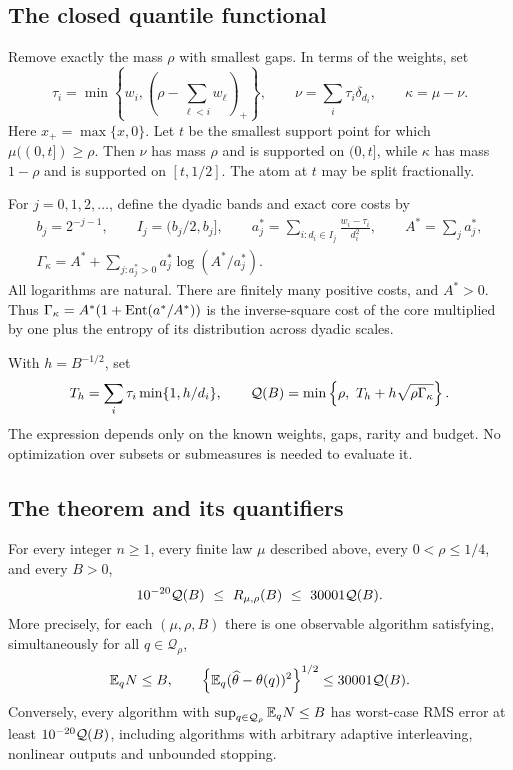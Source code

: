 \subsection{The closed quantile functional}
Remove exactly the mass $\rho$ with smallest gaps. In terms of the
weights, set
\begin{equation}\label{eq:quantile-split}
 \tau_i=\min\left\{w_i,\left(\rho-\sum_{\ell<i}w_\ell\right)_+\right\},
 \qquad \nu=\sum_i\tau_i\delta_{d_i},\qquad \kappa=\mu-\nu.
\end{equation}
Here $x_+=\max\{x,0\}$. Let $t$ be the smallest support point for
which $\mu((0,t])\ge\rho$. Then $\nu$ has mass $\rho$ and is supported
on $(0,t]$, while $\kappa$ has mass $1-\rho$ and is supported on
$[t,1/2]$. The atom at $t$ may be split fractionally.

For $j=0,1,2,\ldots$, define the dyadic bands and exact core costs by
\begin{equation}\label{eq:core-entropy}
 \begin{gathered}
 b_j=2^{-j-1},\qquad I_j=(b_j/2,b_j],\qquad
 a_j^*=\sum_{i:d_i\in I_j}\frac{w_i-\tau_i}{d_i^2},
 \qquad A^*=\sum_j a_j^*,\\
 \Gamma_\kappa=A^*+\sum_{j:a_j^*>0}a_j^*\log(A^*/a_j^*).
 \end{gathered}
\end{equation}
All logarithms are natural. There are finitely many positive costs,
and $A^*>0$. Thus $\Gamma_\kappa=A^*(1+\operatorname{Ent}(a^*/A^*))$ is the
inverse-square cost of the core multiplied by one plus the entropy
of its distribution across dyadic scales.

With $h=B^{-1/2}$, set
\begin{equation}\label{eq:closed-functional}
 T_h=\sum_i\tau_i\min\{1,h/d_i\},\qquad
 \mathcal Q(B)=\min\left\{\rho,\ T_h+h\sqrt{\rho\Gamma_\kappa}\right\}.
\end{equation}
The expression depends only on the known weights, gaps, rarity and
budget. No optimization over subsets or submeasures is needed to
evaluate it.

\subsection{The theorem and its quantifiers}
\begin{theorem}\label{thm:direct-main}
For every integer $n\ge1$, every finite law $\mu$ described above,
every $0<\rho\le1/4$, and every $B>0$,
\begin{equation}\label{eq:main-bounds}
       10^{-20}\mathcal Q(B)\ \le\ R_{\mu,\rho}(B)\ \le\ 30001\mathcal Q(B).
\end{equation}
More precisely, for each $(\mu,\rho,B)$ there is one observable
algorithm satisfying, simultaneously for all $q\in\mathcal Q_\rho$,
\[
 \mathbb E_qN\le B,\qquad
 \left\{\mathbb E_q(\widehat\theta-\theta(q))^2\right\}^{1/2}
 \le30001\mathcal Q(B).
\]
Conversely, every algorithm with
$\sup_{q\in\mathcal Q_\rho}\mathbb E_qN\le B$ has worst-case RMS error
at least $10^{-20}\mathcal Q(B)$, including algorithms with arbitrary
adaptive interleaving, nonlinear outputs and unbounded stopping.
\end{theorem}

